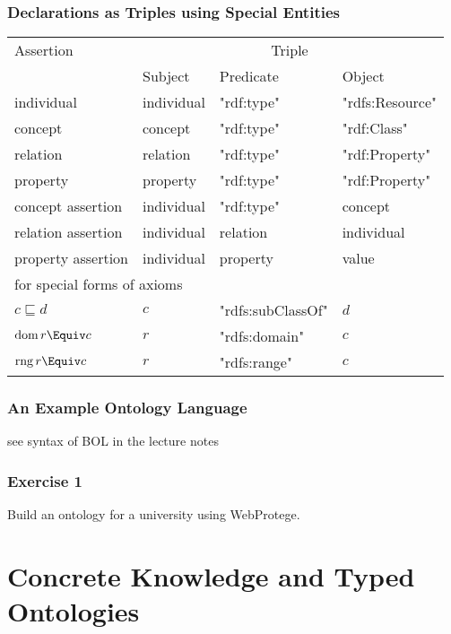 \begin{frame}\frametitle{Declarations as Triples using Special Entities}
\begin{center}
\begin{tabular}{l|lll}
Assertion & \multicolumn{3}{c}{Triple} \\
          & Subject & Predicate & Object \\
\hline
individual & individual & "rdf:type" & "rdfs:Resource" \\
concept  & concept & "rdf:type" & "rdf:Class" \\
relation & relation & "rdf:type" & "rdf:Property" \\
property & property & "rdf:type" & "rdf:Property" \\
concept assertion  & individual & "rdf:type" & concept \\
relation assertion & individual & relation & individual \\
property assertion & individual & property & value \\
\hline
\multicolumn{4}{l}{for special forms of axioms}\\
$c\sqsubseteq d$ & $c$ & "rdfs:subClassOf" & $d$ \\
$\dom\,r\Equiv c$ & $r$ & "rdfs:domain" & $c$ \\
$\rng\, r\Equiv c$ & $r$ & "rdfs:range" & $c$ \\
\end{tabular}
\end{center}
\end{frame}

\begin{frame}\frametitle{An Example Ontology Language}
see syntax of BOL in the lecture notes
\end{frame}

\begin{frame}\frametitle{Exercise 1}
Build an ontology for a university using WebProtege.
\end{frame}

\section{Concrete Knowledge and Typed Ontologies}

